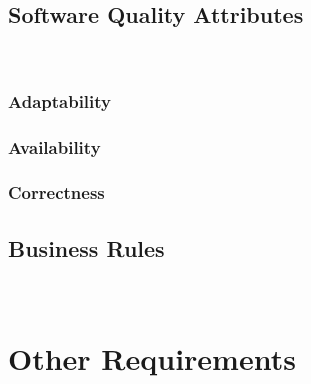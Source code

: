 \documentclass{report}
\begin{document}

\section{Software Quality Attributes} ~~~
\subsection{Adaptability}
\subsection{Availability}
\subsection{Correctness}

\section{Business Rules} ~~~


\chapter{Other Requirements}
\end{document}
